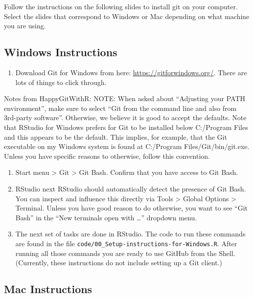 \documentclass[
]{book}
\providecommand{\tightlist}{%
  \setlength{\itemsep}{0pt}\setlength{\parskip}{0pt}}
\begin{document}
Follow the instructions on the following slides to install git on your computer. Select the slides that correspond to Windows or Mac depending on what machine you are using.

\hypertarget{windows-instructions}{%
\subsection{Windows Instructions}\label{windows-instructions}}

\begin{enumerate}
\def\labelenumi{\arabic{enumi})}
\tightlist
\item
  Download Git for Windows from here: \url{https://gitforwindows.org/}. There are lots of things to click through.
\end{enumerate}

Notes from HappyGitWithR:
NOTE: When asked about ``Adjusting your PATH environment'', make sure to select ``Git from the command line and also from 3rd-party software''. Otherwise, we believe it is good to accept the defaults.
Note that RStudio for Windows prefers for Git to be installed below C:/Program Files and this appears to be the default. This implies, for example, that the Git executable on my Windows system is found at C:/Program Files/Git/bin/git.exe. Unless you have specific reasons to otherwise, follow this convention.

\begin{enumerate}
\def\labelenumi{\arabic{enumi})}
\setcounter{enumi}{1}
\item
  Start menu \textgreater{} Git \textgreater{} Git Bash. Confirm that you have access to Git Bash.
\item
  RStudio next
  RStudio should automatically detect the presence of Git Bash. You can inspect and influence this directly via Tools \textgreater{} Global Options \textgreater{} Terminal. Unless you have good reason to do otherwise, you want to see ``Git Bash'' in the ``New terminals open with \ldots{}'' dropdown menu.
\item
  The next set of tasks are done in RStudio. The code to run these commands are found in the file \texttt{code/00\_Setup-instructions-for-Windows.R}. After running all those commands you are ready to use GitHub from the Shell. (Currently, these instructions do not include setting up a Git client.)
\end{enumerate}

\hypertarget{mac-instructions}{%
\subsection{Mac Instructions}\label{mac-instructions}}
\end{document}
